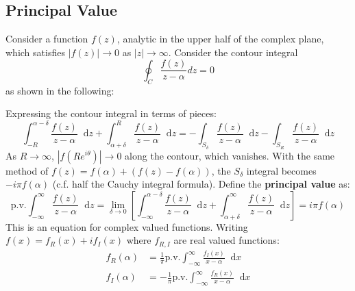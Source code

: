 \documentclass{article}
\newcommand{\diff}{\mathop{}\!\mathrm{d}}
\newcommand{\principalvalue}{\text{p.v.}}
\theoremstyle{definition}
\begin{document}
\subsection{Principal Value}
Consider a function $f(z)$, analytic in the upper half of the complex plane, which
satisfies $|f(z)| \to 0$ as $|z| \to \infty$. Consider the contour integral
\begin{equation*}
	\oint_C \frac{f(z)}{z - \alpha} dz = 0
\end{equation*}
as shown in the following:
\begin{center}
\end{center}
Expressing the contour integral in terms of pieces:
\begin{equation*}
	\int_{-R}^{\alpha-\delta} \frac{f(z)}{z-\alpha} \diff z + \int_{\alpha+\delta}^R \frac{f(z)}{z-\alpha} \diff z = -\int_{S_\delta} \frac{f(z)}{z-\alpha} \diff z - \int_{S_R} \frac{f(z)}{z-\alpha} \diff z
\end{equation*}
As $R \to \infty$, $|f(Re^{i\theta})| \to 0$ along the contour, which vanishes. With
the same method of $f(z) = f(\alpha) + (f(z) - f(\alpha))$, the $S_\delta$ integral
becomes $-i\pi f(\alpha)$ (c.f. half the Cauchy integral formula). Define the
\textbf{principal value} as:
\begin{equation*}
	\principalvalue \int_{-\infty}^\infty \frac{f(z)}{z-\alpha} \diff z = \lim_{\delta \to 0}\left[\int_{-\infty}^{\alpha-\delta} \frac{f(z)}{z-\alpha} \diff z + \int_{\alpha+\delta}^\infty \frac{f(z)}{z-\alpha} \diff z \right]= i \pi f(\alpha)
\end{equation*}
This is an equation for complex valued functions. Writing $f(x) = f_R(x) + if_I(x)$
where $f_{R,I}$ are real valued functions:
\begin{equation*}
\begin{split}
	f_R(\alpha) &=  \frac{1}{\pi} \principalvalue \int_{-\infty}^\infty \frac{f_I(x)}{x-\alpha} \diff x \\
	f_I(\alpha) &= -\frac{1}{\pi} \principalvalue \int_{-\infty}^\infty \frac{f_R(x)}{x-\alpha} \diff x \\
\end{split}
\end{equation*}
\end{document}
